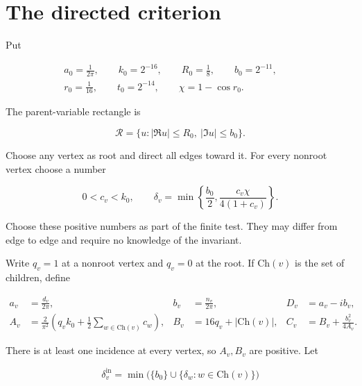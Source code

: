 \section{The directed criterion}\label{dk:sec-1}

Put

\begin{equation}\label{dk:eq-1}
\begin{gathered}
a_0=\frac1{2\pi},\qquad k_0=2^{-16},\qquad
 R_0=\frac18,\qquad b_0=2^{-11},\qquad\\
 r_0=\frac1{16},\qquad t_0=2^{-14},\qquad
 \chi=1-\cos r_0.
\end{gathered}
\end{equation}

The parent-variable rectangle is

\begin{equation}\label{dk:eq-2}
\mathcal R=\{u:|\Re u|\le R_0,\ |\Im u|\le b_0\}.
\end{equation}

Choose any vertex as root and direct all edges toward it. For every
nonroot vertex choose a number

\begin{equation}\label{dk:eq-3}
0<c_v<k_0,
 \qquad
 \delta_v=\min\left\{\frac{b_0}2,
               \frac{c_v\chi}{4(1+c_v)}\right\}.
\end{equation}

Choose these positive numbers as part of the finite test. They may
differ from edge to edge and require no knowledge of the invariant.

Write \(q_v=1\) at a nonroot vertex and \(q_v=0\) at the root. If \(\mathrm{Ch}(v)\) is the
set of children, define

\begin{equation}\label{dk:eq-4}
\begin{aligned}
 a_v&=\frac{d_v}{2\pi},& b_v&=\frac{n_v}{2\pi},&
 D_v&=a_v-i b_v,\\
 A_v&=\frac2{\pi^2}
       \left(q_vk_0+\frac12\sum_{w\in\mathrm{Ch}(v)}c_w\right),&
 B_v&=16q_v+|\mathrm{Ch}(v)|,&
 C_v&=B_v+\frac{b_v^2}{4A_v}.
\end{aligned}
\end{equation}

There is at least one incidence at every vertex, so \(A_v,B_v\) are positive.
Let

\begin{equation}\label{dk:eq-5}
\delta_v^{\mathrm{in}}
      =\min\bigl(\{b_0\}\cup
                     \{\delta_w:w\in\mathrm{Ch}(v)\}\bigr)
\end{equation}

